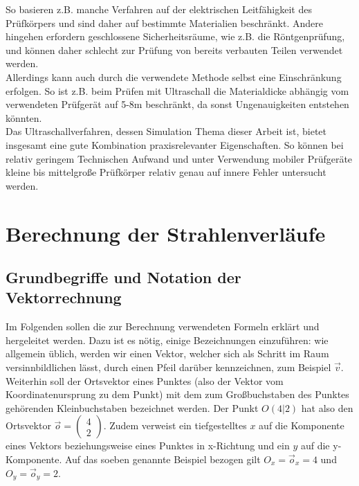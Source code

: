 \documentclass[reducespace,stylepage,semiarbeit]{spezidoc}
\newcommand{\vect}[2]{\begin{pmatrix}#1\\#2\end{pmatrix}}
\begin{document}
So basieren z.B. manche Verfahren auf der elektrischen Leitfähigkeit des Prüfkörpers und sind daher auf bestimmte Materialien beschränkt.
Andere hingehen erfordern geschlossene Sicherheitsräume, wie z.B. die Röntgenprüfung, und können daher schlecht zur Prüfung von bereits verbauten Teilen verwendet werden.\\
Allerdings kann auch durch die verwendete Methode selbst eine Einschränkung erfolgen. So ist z.B. beim Prüfen mit Ultraschall die Materialdicke abhängig vom verwendeten Prüfgerät auf 5-8m beschränkt, da sonst Ungenauigkeiten entstehen könnten.\\
Das Ultraschallverfahren, dessen Simulation Thema dieser Arbeit ist, bietet insgesamt eine gute Kombination praxisrelevanter
 Eigenschaften. So können bei relativ geringem Technischen Aufwand und unter Verwendung mobiler Prüfgeräte kleine bis mittelgroße Prüfkörper relativ genau auf innere Fehler untersucht werden.

\newpage

\section{Berechnung der Strahlenverläufe}

\subsection{Grundbegriffe und Notation der Vektorrechnung}
Im Folgenden sollen die zur Berechnung verwendeten Formeln erklärt und hergeleitet werden. 
Dazu ist es nötig, einige Bezeichnungen einzuführen: wie allgemein üblich, werden wir einen Vektor, welcher sich als \glqq Schritt\grqq{} im Raum versinnbildlichen lässt, durch einen Pfeil darüber kennzeichnen, zum Beispiel $\vec{v}$. 
Weiterhin soll der Ortsvektor eines Punktes (also der Vektor vom Koordinatenursprung zu dem Punkt) mit dem zum Großbuchstaben des Punktes gehörenden Kleinbuchstaben bezeichnet werden. Der Punkt $O(4|2)$ hat also den Ortsvektor $\vec{o} = \vect{4}{2}$. 
Zudem verweist ein tiefgestelltes $x$ auf die Komponente eines Vektors beziehungsweise eines Punktes in x-Richtung und ein $y$ auf die y-Komponente. 
Auf das soeben genannte Beispiel bezogen gilt $O_x = \vec{o}_x = 4$ und $O_y = \vec{o}_y = 2$.
\end{document}
